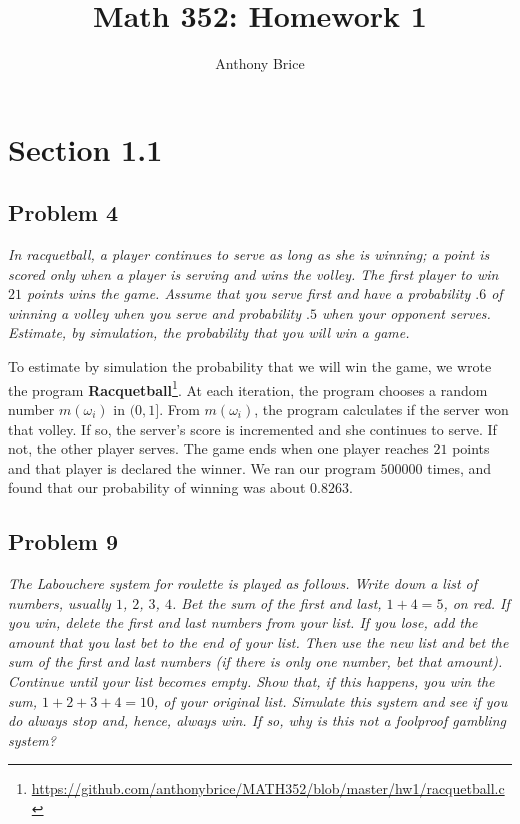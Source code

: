 \documentclass{tufte-handout}
\title{Math 352: Homework 1}
\author{Anthony Brice}
\begin{document}
\maketitle
\section{Section 1.1}
\subsection{Problem 4}
\begin{description}
\item \textit{In racquetball, a player continues to serve as long as
    she is winning; a point is scored only when a player is serving
    and wins the volley. The first player to win $21$ points wins the
    game. Assume that you serve first and have a probability $.6$ of
    winning a volley when you serve and probability $.5$ when your
    opponent serves. Estimate, by simulation, the probability that you
    will win a game.}
\end{description}

To estimate by simulation the probability that we will win the game,
we wrote the program \textbf{Racquetball}\footnote{
  \url{https://github.com/anthonybrice/MATH352/blob/master/hw1/racquetball.c}}.
At each iteration, the program chooses a random number $m(\omega_i)$
in $(0,1]$. From $m(\omega_i)$, the program calculates if the server
won that volley. If so, the server's score is incremented and she
continues to serve. If not, the other player serves. The game ends
when one player reaches $21$ points and that player is declared the
winner. We ran our program $500000$ times, and found that our
probability of winning was about $0.8263$.

\subsection{Problem 9}
\begin{description}
\item \textit{The \textit{Labouchere system} for roulette is played as
    follows. Write down a list of numbers, usually $1$, $2$, $3$,
    $4$. Bet the sum of the first and last, $1+4 = 5$, on red. If you
    win, delete the first and last numbers from your list. If you
    lose, add the amount that you last bet to the end of your
    list. Then use the new list and bet the sum of the first and last
    numbers (if there is only one number, bet that amount). Continue
    until your list becomes empty. Show that, if this happens, you win
    the sum, $1+2+3+4 = 10$, of your original list. Simulate this
    system and see if you do always stop and, hence, always win. If
    so, why is this not a foolproof gambling system?}
\end{description}
\end{document}
